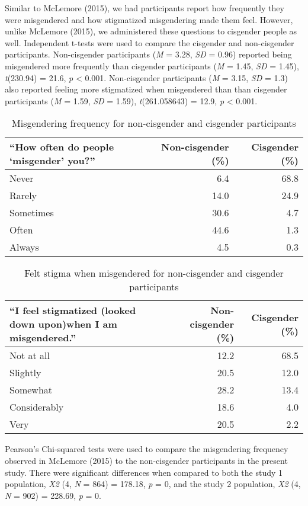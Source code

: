 \documentclass[12pt,twoside]{reedthesis}
\begin{document}
Similar to McLemore (2015), we had participants report how frequently they were misgendered and how stigmatized misgendering made them feel. However, unlike McLemore (2015), we administered these questions to cisgender people as well. Independent t-tests were used to compare the cisgender and non-cisgender participants. Non-cisgender participants (\emph{M} = 3.28, \emph{SD} = 0.96) reported being misgendered more frequently than cisgender participants (\emph{M} = 1.45, \emph{SD} = 1.45), \emph{t}(230.94) = 21.6, \emph{p} \textless{} 0.001.
Non-cisgender participants (\emph{M} = 3.15, \emph{SD} = 1.3) also reported feeling more stigmatized when misgendered than than cisgender participants (\emph{M} = 1.59, \emph{SD} = 1.59), \emph{t}(261.058643) = 12.9, \emph{p} \textless{} 0.001.
\begin{table}

\caption{\label{tab:unnamed-chunk-6}Misgendering frequency for non-cisgender and cisgender participants}
\centering
\begin{tabular}[t]{l|r|r}
\hline
“How often do people ‘misgender’ you?” & Non-cisgender (\%) & Cisgender (\%)\\
\hline
Never & 6.4 & 68.8\\
\hline
Rarely & 14.0 & 24.9\\
\hline
Sometimes & 30.6 & 4.7\\
\hline
Often & 44.6 & 1.3\\
\hline
Always & 4.5 & 0.3\\
\hline
\end{tabular}
\end{table}
\begin{table}

\caption{\label{tab:unnamed-chunk-7}Felt stigma when misgendered for non-cisgender and cisgender participants}
\centering
\begin{tabular}[t]{l|r|r}
\hline
“I feel stigmatized (looked down upon)when I am misgendered.” & Non-cisgender (\%) & Cisgender (\%)\\
\hline
Not at all & 12.2 & 68.5\\
\hline
Slightly & 20.5 & 12.0\\
\hline
Somewhat & 28.2 & 13.4\\
\hline
Considerably & 18.6 & 4.0\\
\hline
Very & 20.5 & 2.2\\
\hline
\end{tabular}
\end{table}
Pearson's Chi-squared tests were used to compare the misgendering frequency observed in McLemore (2015) to the non-cisgender participants in the present study.
There were significant differences when compared to both the study 1 population, \emph{X2} (4, \emph{N} = 864) = 178.18, \emph{p} = 0, and the study 2 population, \emph{X2} (4, \emph{N} = 902) = 228.69, \emph{p} = 0.
\end{document}
